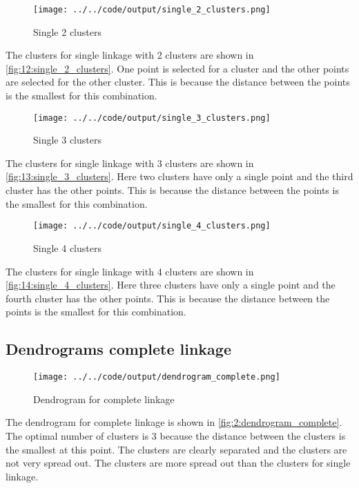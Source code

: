 \documentclass[twoside, a4paper, fleqn, reqno]{article}
\begin{document}
\begin{figure}[H]
	\centering
	\texttt{[image: ../../code/output/single\_2\_clusters.png]}
	\caption{Single 2 clusters}
	\label{fig:12:single_2_clusters}
\end{figure}

The clusters for single linkage with 2 clusters are shown in \autoref{fig:12:single_2_clusters}.
One point is selected for a cluster and the other points are selected for the other cluster.
This is because the distance between the points is the smallest for this combination.

\begin{figure}[H]
	\centering
	\texttt{[image: ../../code/output/single\_3\_clusters.png]}
	\caption{Single 3 clusters}
	\label{fig:13:single_3_clusters}
\end{figure}

The clusters for single linkage with 3 clusters are shown in \autoref{fig:13:single_3_clusters}.
Here two clusters have only a single point and the third cluster has the other points.
This is because the distance between the points is the smallest for this combination.

\begin{figure}[H]
	\centering
	\texttt{[image: ../../code/output/single\_4\_clusters.png]}
	\caption{Single 4 clusters}
	\label{fig:14:single_4_clusters}
\end{figure}

The clusters for single linkage with 4 clusters are shown in \autoref{fig:14:single_4_clusters}.
Here three clusters have only a single point and the fourth cluster has the other points.
This is because the distance between the points is the smallest for this combination.

\subsection{Dendrograms complete linkage}

\begin{figure}[H]
	\centering
	\texttt{[image: ../../code/output/dendrogram\_complete.png]}
	\caption{Dendrogram for complete linkage}
	\label{fig:2:dendrogram_complete}
\end{figure}

The dendrogram for complete linkage is shown in \autoref{fig:2:dendrogram_complete}.
The optimal number of clusters is 3 because the distance between the clusters is the smallest at this point.
The clusters are clearly separated and the clusters are not very spread out.
The clusters are more spread out than the clusters for single linkage.
\end{document}
